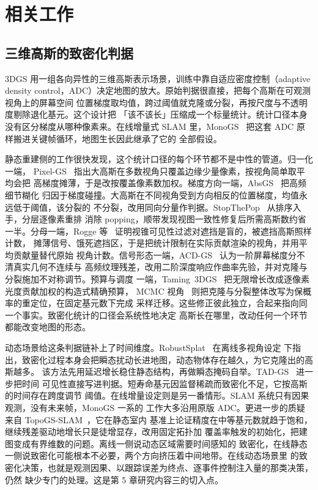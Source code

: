 %

\chapter{相关工作}
\label{ch:related}

\section{三维高斯的致密化判据}
\label{sec:related-densification}

3DGS 用一组各向异性的三维高斯表示场景，训练中靠自适应密度控制（adaptive density
control，ADC）决定地图的放大。原始判据很直接，把每个高斯在可观测视角上的屏幕空间
位置梯度取均值，跨过阈值就克隆或分裂，再按尺度与不透明度剔除退化基元。这个设计把
「该不该长」压缩成一个标量统计。统计口径本身没有区分梯度从哪种像素来。在线增量式
SLAM 里，MonoGS~\cite{MonoGS} 把这套 ADC 原样搬进关键帧循环，地图生长因此继承了它的
全部假设。

静态重建侧的工作很快发现，这个统计口径的每个环节都不是中性的管道。归一化一端，
Pixel-GS~\cite{pixelgs} 指出大高斯在多数视角只覆盖边缘少量像素，按视角简单取平均会把
高梯度摊薄，于是改按覆盖像素数加权。梯度方向一端，AbsGS~\cite{absgs} 把高频细节糊化
归因于梯度碰撞。大高斯在不同视角受到方向相反的位置梯度，均值永远低于阈值，该分裂的
不分裂，改用同向分量作判据。StopThePop~\cite{stopthepop} 从排序入手，分层逐像素重排
消除 popping，顺带发现视图一致性修复后所需高斯数约省一半。分母一端，Rogge
等~\cite{counting_contributions} 证明视锥可见性过滤对遮挡是盲的，被遮挡高斯照样计数，
摊薄信号、饿死遮挡区，于是把统计限制在实际贡献渲染的视角，并用平均贡献量替代原始
视角计数。信号形态一端，ACD-GS~\cite{acdgs} 认为一阶屏幕梯度分不清真实几何不连续与
高频纹理残差，改用二阶深度响应作曲率先验，并对克隆与分裂施加不对称调节。预算与调度
一端，Taming~3DGS~\cite{taming3dgs} 把无限增长改成逐像素光度贡献加权的构造式精确预算，
MCMC 视角~\cite{mcmcgs} 则把克隆与分裂整体改写为保概率的重定位，在固定基元数下完成
采样迁移。这些修正彼此独立，合起来指向同一个事实。致密化统计的口径会系统性地决定
高斯长在哪里，改动任何一个环节都能改变地图的形态。

动态场景给这条判据链补上了时间维度。RobustSplat~\cite{robustsplat} 在离线多视角设定
下指出，致密化过程本身会把瞬态扰动长进地图，动态物体存在越久，为它克隆出的高斯越多。
该方法先用延迟增长稳住静态结构，再做瞬态掩码自举。TAD-GS~\cite{tadgs} 进一步把时间
可见性直接写进判据。短寿命基元因监督稀疏而致密化不足，它按高斯的时间存在跨度调节
阈值。在线增量设定则是另一番情形。SLAM 系统只有因果观测，没有未来帧，MonoGS 一系的
工作大多沿用原版 ADC。更进一步的质疑来自 TopoGS-SLAM~\cite{topogsslam}，它在静态室内
基准上论证精度在中等基元数就趋于饱和，继续残差驱动地增长只是徒增显存，改用固定拓扑加
覆盖率触发的初始化，把建图变成有界维数的问题。离线一侧说动态区域需要时间感知的
致密化，在线静态一侧说致密化可能根本不必要，两个方向挤压着中间地带。在线动态场景里
的致密化决策，也就是观测因果、以跟踪误差为终点、逐事件控制注入量的那类决策，仍然
缺少专门的处理。这是第 5 章研究内容三的切入点。

